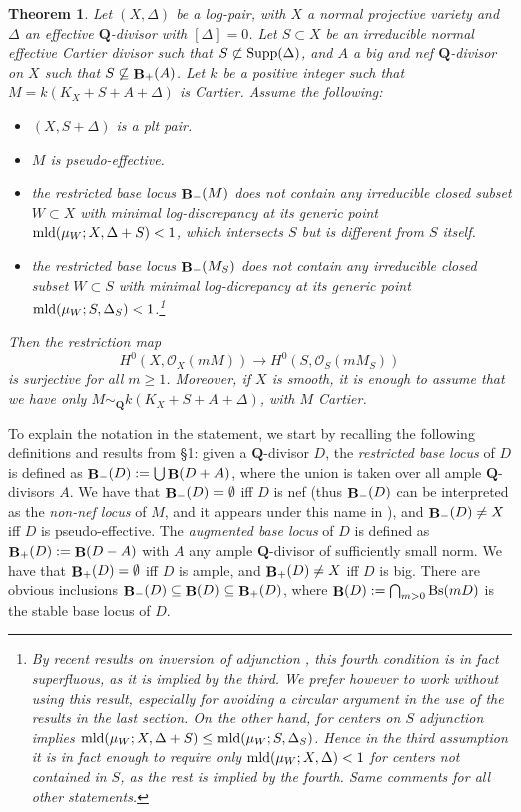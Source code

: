 \documentclass[11pt]{amsart}
\theoremstyle{plain}
\newtheorem{theoremalpha}{Theorem}
\theoremstyle{definition}
\newcommand{\QQ}{\mathbf{Q}}
\newcommand{\OO}{\mathcal  {O}}
\DeclareMathOperator{\Bs}{Bs}
\DeclareMathOperator{\BB}{{\bf B}}
\begin{document}
\begin{theoremalpha}\label{extension0}
Let $(X, \Delta)$ be a log-pair, with $X$ a normal projective variety and $\Delta$ an effective $\QQ$-divisor with $[\Delta] = 0$. Let $S \subset X$ be an irreducible normal effective Cartier divisor such that $S \not\subset {\rm Supp}(\Delta)$, and $A$ a big and nef $\QQ$-divisor on $X$ such that $S \not\subseteq \BB_{+} (A)$. Let $k$ be a positive integer such that $M = k(K_X + S + A + \Delta)$ is Cartier. Assume the following:
\begin{itemize}
\item $(X, S +  \Delta)$ is a plt pair. 
\item $M$ is pseudo-effective.
\item the restricted base locus $\BB_{-} (M)$ does not contain any irreducible closed subset $W\subset X$ 
with minimal log-discrepancy at its generic point ${\rm mld}(\mu_W ; X, \Delta +S) < 1$,
which intersects $S$ but is different from $S$ itself.
\item the restricted base locus $\BB_{-} (M_S)$ does not contain any irreducible closed subset 
$W\subset S$ with minimal log-dicrepancy at its generic point ${\rm mld}(\mu_W ; S, \Delta_S) < 1$.\footnote{By recent results on inversion of adjunction \cite{bchm}, this fourth condition is in fact superfluous, as it is implied by the third. We prefer however to work 
without using this result, especially for avoiding a circular argument in the use of the results in the last section. On the other hand, for centers on $S$ adjunction implies ${\rm mld}(\mu_W ; X, \Delta +S) \le {\rm mld}(\mu_W ; S, \Delta_S)$. Hence in the third assumption it is in fact enough to require only ${\rm mld}(\mu_W ; X, \Delta) < 1$ for centers not contained in $S$, as the rest is implied by the fourth. Same comments for all other statements.} 
\end{itemize}
Then the restriction map
$$H^0 (X, \OO_X (mM)) \longrightarrow H^0 (S, \OO_S (mM_S))$$
is surjective for all $m \ge 1$. Moreover, if $X$ is smooth, it is enough to assume that we have only $M\sim_{\QQ}  k(K_X + S + A + \Delta)$, with $M$ Cartier.
\end{theoremalpha}

To explain the notation in the statement, we start by recalling the following definitions and results from \cite{elmnp} \S1: given a $\QQ$-divisor $D$, the \emph{restricted base locus} of $D$ is defined as $\BB_{-} (D) := \bigcup \BB (D + A)$, where the union is 
taken over all ample $\QQ$-divisors $A$. We have that $\BB_{-} (D) = \emptyset$ iff $D$ is nef (thus $\BB_{-} (D)$ can be interpreted as the \emph{non-nef locus} of $M$, and it appears under this name in \cite{bdpp}), and $\BB_{-} (D) \neq X$ iff $D$ is 
pseudo-effective. The \emph{augmented base locus} of $D$ is defined as $\BB_{+} (D) := \BB (D - A)$ with $A$ any ample 
$\QQ$-divisor of sufficiently small norm. We have that $\BB_{+} (D) = \emptyset$ iff $D$ is ample, and $\BB_{+} (D) \neq X$ iff $D$ is big. There are obvious inclusions $\BB_{-} (D) \subseteq \BB (D) \subseteq \BB_{+} (D)$, where $\BB(D) : =  \bigcap_{m > 0} \Bs(mD)$ is the stable base locus of $D$. 
\end{document}
